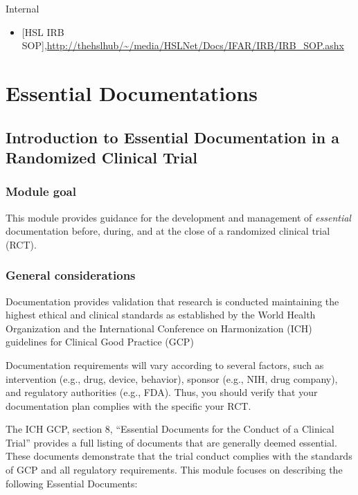 \documentclass[]{book}
\providecommand{\tightlist}{%
  \setlength{\itemsep}{0pt}\setlength{\parskip}{0pt}}
\theoremstyle{definition}
\theoremstyle{definition}
\theoremstyle{definition}
\theoremstyle{remark}
\begin{document}
Internal

\begin{itemize}
\tightlist
\item
  {[}HSL IRB
  SOP{]},\url{http://thehslhub/~/media/HSLNet/Docs/IFAR/IRB/IRB_SOP.ashx}
\end{itemize}

\chapter{Essential Documentations}\label{essential-documentations}

\section{Introduction to Essential Documentation in a Randomized
Clinical
Trial}\label{introduction-to-essential-documentation-in-a-randomized-clinical-trial}

\subsection{Module goal}\label{module-goal-1}

This module provides guidance for the development and management of
\emph{essential} documentation before, during, and at the close of a
randomized clinical trial (RCT).

\subsection{General considerations}\label{general-considerations}

Documentation provides validation that research is conducted maintaining
the highest ethical and clinical standards as established by the World
Health Organization and the International Conference on Harmonization
(ICH) guidelines for Clinical Good Practice (GCP)

Documentation requirements will vary according to several factors, such
as intervention (e.g., drug, device, behavior), sponsor (e.g., NIH, drug
company), and regulatory authorities (e.g., FDA). Thus, you should
verify that your documentation plan complies with the specific your RCT.

The ICH GCP, section 8, ``Essential Documents for the Conduct of a
Clinical Trial'' provides a full listing of documents that are generally
deemed essential. These documents demonstrate that the trial conduct
complies with the standards of GCP and all regulatory requirements. This
module focuses on describing the following Essential Documents:
\end{document}

